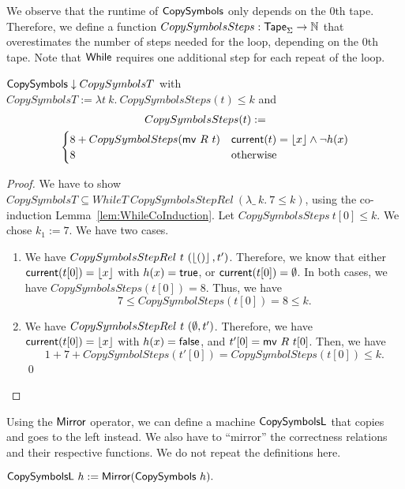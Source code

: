 We observe that the runtime of $\mathsf{CopySymbols}$ only depends on the $0$th tape.  Therefore, we define a function
$CopySymbolsSteps : \mathsf{Tape}_\Sigma \rightarrow \mathbb{N}$ that overestimates the number of steps needed for the loop, depending on the $0$th tape.  Note that
$\mathsf{While}$ requires one additional step for each repeat of the loop.
\begin{lemma}
  $\mathsf{CopySymbols} \mathrel{\downarrow} CopySymbolsT$ with \\
  $CopySymbolsT := \lambda t~k.~CopySymbolsSteps(t) \leq k$ and
  \begin{multline*}
    CopySymbolsSteps (t) := \\
    \begin{cases}
      8 + CopySymbolSteps(\mathsf{mv}~R~t) & \mathsf{current}(t)=\left\lfloor {x} \right\rfloor \land \lnot h(x) \\
      8                                & \text{otherwise}
    \end{cases}
  \end{multline*}
\end{lemma}
\begin{proof}
  We have to show $CopySymbolsT \subseteq WhileT~CopySymbolsStepRel~(\lambda \_~k.~7 \leq k)$, using the co-induction
  Lemma~\ref{lem:WhileCoInduction}.  Let $CopySymbolsSteps~t[0] \leq k$.  We chose $k_1 := 7$.  We have two cases.
  \begin{enumerate}
  \item We have $CopySymbolsStepRel~t~(\left\lfloor {\ensuremath{\mathsf{()}}} \right\rfloor, t')$.  Therefore, we know that either $\mathsf{current}(t[0])=\left\lfloor {x} \right\rfloor$ with $h(x)=\mathsf{true}$, or
    $\mathsf{current}(t[0])=\emptyset$.  In both cases, we have $CopySymbolsSteps(t[0]) = 8$.  Thus, we have
    $$ 7 \leq CopySymbolSteps(t[0]) = 8 \leq k. $$
  \item We have $CopySymbolsStepRel~t~(\emptyset, t')$.  Therefore, we have $\mathsf{current}(t[0])=\left\lfloor {x} \right\rfloor$ with $h(x)=\mathsf{false}$, and $t'[0]=\mathsf{mv}~R~t[0]$.
    Then, we have
    $$ 1+7+CopySymbolSteps(t'[0]) = CopySymbolSteps(t[0]) \leq k.$$
    \qed
  \end{enumerate}
\end{proof}

Using the $\mathsf{Mirror}$ operator, we can define a machine $\MS{CopySymbolsL}$ that copies and goes to the left instead.  We also have to ``mirror''
the correctness relations and their respective functions.  We do not repeat the definitions here.
\begin{definition}[$\MS{CopySymbolsL}$]
  $\mathsf{CopySymbolsL}~h := \mathsf{Mirror}(\mathsf{CopySymbols}~h).$
\end{definition}


